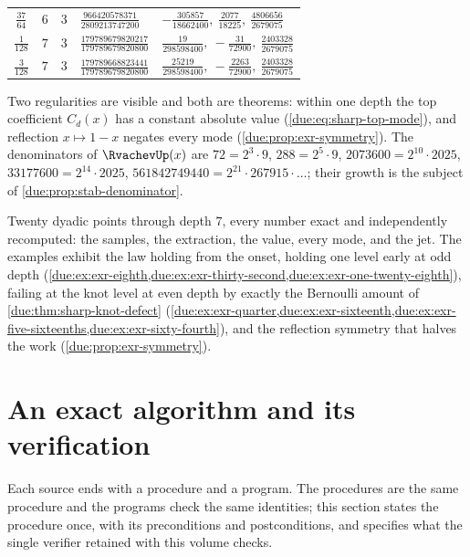 \documentclass[11pt,oneside]{article}
\theoremstyle{plain}
\theoremstyle{definition}
\theoremstyle{remark}
\newcommand{\Cr}[2]{C_{#1}\!\left(#2\right)}                %
\begin{document}
\begin{center}
\begin{longtable}{@{}c c c l l@{}}
$\tfrac{37}{64}$ & $6$ & $3$ & $\tfrac{966420578371}{2809213747200}$ & $-\tfrac{305857}{18662400},\ \tfrac{2077}{18225},\ \tfrac{4806656}{2679075}$\\
$\tfrac1{128}$ & $7$ & $3$ & $\tfrac{179789679820217}{179789679820800}$ & $\tfrac{19}{298598400},\ -\tfrac{31}{72900},\ \tfrac{2403328}{2679075}$\\
$\tfrac3{128}$ & $7$ & $3$ & $\tfrac{179789668823441}{179789679820800}$ & $\tfrac{25219}{298598400},\ -\tfrac{2263}{72900},\ \tfrac{2403328}{2679075}$\\
\bottomrule
\end{longtable}
\end{center}

Two regularities are visible and both are theorems: within one depth the
top coefficient $\Cr{d}{x}$ has a constant absolute value
(\cref{due:eq:sharp-top-mode}), and reflection $x\mapsto1-x$ negates every
mode (\cref{due:prop:exr-symmetry}).  The denominators of
$\RvachevUp(x)$ are $72=2^{3}\cdot9$, $288=2^{5}\cdot9$,
$2073600=2^{10}\cdot2025$, $33177600=2^{14}\cdot2025$,
$561842749440=2^{21}\cdot267915\cdot\ldots$; their growth is the subject of
\cref{due:prop:stab-denominator}.

\begin{summarybox}[title={Section summary}]
Twenty dyadic points through depth $7$, every number exact and
independently recomputed: the samples, the extraction, the value, every
mode, and the jet.  The examples exhibit the law holding from the onset,
holding one level early at odd depth (\cref{due:ex:exr-eighth,due:ex:exr-thirty-second,due:ex:exr-one-twenty-eighth}),
failing at the knot level at even depth by exactly the Bernoulli amount of
\cref{due:thm:sharp-knot-defect}
(\cref{due:ex:exr-quarter,due:ex:exr-sixteenth,due:ex:exr-five-sixteenths,due:ex:exr-sixty-fourth}),
and the reflection symmetry that halves the work
(\cref{due:prop:exr-symmetry}).
\end{summarybox}

\section{An exact algorithm and its verification}
\label{due:sec:algorithm}

Each source ends with a procedure and a program.  The procedures are the
same procedure and the programs check the same identities; this section
states the procedure once, with its preconditions and postconditions, and
specifies what the single verifier retained with this volume checks.
\end{document}
